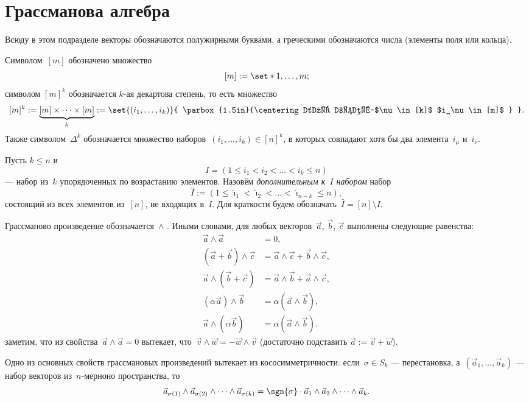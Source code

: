 \section{Грассманова алгебра}%
\label{sec:Grassmannian_algebra}

Всюду в этом подразделе векторы обозначаются полужирными буквами, а греческими обозначаются числа (элементы поля или кольца).

Символом~$[m]$ обозначено множество
\[
	[m] := \set*{1, \dots, m}
	;
\]
символом $[m]^k$ обозначается $k$-ая декартова степень, то есть множество
\[
	[m]^k :=
	\underbrace{
		[m] \times \cdots \times [m]
	}_{k}
	:=
	\set{
		(i_1, \dots, i_k)
	}{
		\parbox{1.5in}{%
			\centering
			для всех~$\nu \in [k]$ %
			$i_\nu \in [m]$
		}
	}
	.
\]
Также символом~$\Delta^k$ обозначается множество наборов~$(i_1, \dots, i_k) \in [n]^k$, в которых совпадают хотя бы два элемента~$i_\mu$ и~$i_\nu$.

Пусть $k \leq n$ и
\[
	I = (1 \leq i_1 < i_2 < \dots < i_k \leq n)
\]
--- набор из~$k$ упорядоченных по возрастанию элементов. Назовём \emph{дополнительным к~$I$ набором} набор
\[
	\hat{I} :=
	(1 \leq \hat{\imath}_1 < \hat{\imath}_2 < \dots < \hat{\imath}_{n-k} \leq n),
\]
состоящий из всех элементов из~$[n]$, не входящих в~$I$.
Для краткости будем обозначать~$\hat{I} = [n] \setminus I$.

Грассманово произведение обозначается~$\wedge$ . Иными словами, для любых векторов~$\vec{a}$, $\vec{b}$, $\vec{c}$ выполнены следующие равенства:
\begin{align*}
	\vec{a} \wedge \vec{a} &= 0,
	\\
	(\vec{a} + \vec{b}) \wedge \vec{c} &=
	\vec{a} \wedge \vec{c} +
	\vec{b} \wedge \vec{c},
	\\
	\vec{a} \wedge (\vec{b} + \vec{c}) &=
	\vec{a} \wedge \vec{b} +
	\vec{a} \wedge \vec{c},
	\\
	(\alpha \vec{a}) \wedge \vec{b} &=
	\alpha (\vec{a} \wedge \vec{b})
	,
	\\
	\vec{a} \wedge (\alpha \vec{b}) &=
	\alpha (\vec{a} \wedge \vec{b})
	.
\end{align*}
заметим, что из свойства~$\vec{a} \wedge \vec{a} = 0$ вытекает, что~$\vec{v} \wedge \vec{w} = -\vec{w} \wedge \vec{v}$ (достаточно подставить $\vec{a} := \vec{v} + \vec{w}$).

Одно из основных свойств грассмановых произведений вытекает из кососимметричности: если~$\sigma \in S_k$ --- перестановка, а~$(\vec{a}_1, \dots, \vec{a}_k)$ --- набор векторов из~$n$-мерноно пространства, то
\[
	\vec{a}_{\sigma(1)}
	\wedge
	\vec{a}_{\sigma(2)}
	\wedge
	\cdots
	\wedge
	\vec{a}_{\sigma(k)}
	=
	\sgn{\sigma} \cdot
	\vec{a}_{1}
	\wedge
	\vec{a}_{2}
	\wedge
	\cdots
	\wedge
	\vec{a}_{k}
	.
\]

